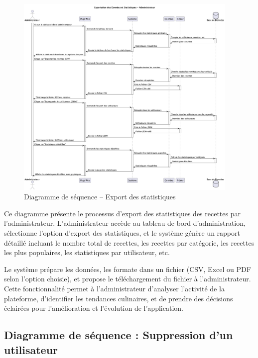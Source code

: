 \documentclass[12pt,a4paper]{report}
\begin{document}
\begin{figure}[H]
    \centering
    \includegraphics[width=0.95\textwidth]{sequence_diagram_export_statistiques.png}
    \caption{Diagramme de séquence – Export des statistiques}
    \label{fig:sequence_export_statistiques}
\end{figure}

Ce diagramme présente le processus d'export des statistiques des recettes par l'administrateur. L'administrateur accède au tableau de bord d'administration, sélectionne l'option d'export des statistiques, et le système génère un rapport détaillé incluant le nombre total de recettes, les recettes par catégorie, les recettes les plus populaires, les statistiques par utilisateur, etc.

Le système prépare les données, les formate dans un fichier (CSV, Excel ou PDF selon l'option choisie), et propose le téléchargement du fichier à l'administrateur. Cette fonctionnalité permet à l'administrateur d'analyser l'activité de la plateforme, d'identifier les tendances culinaires, et de prendre des décisions éclairées pour l'amélioration et l'évolution de l'application.

\subsection{Diagramme de séquence : Suppression d'un utilisateur}
\end{document}
